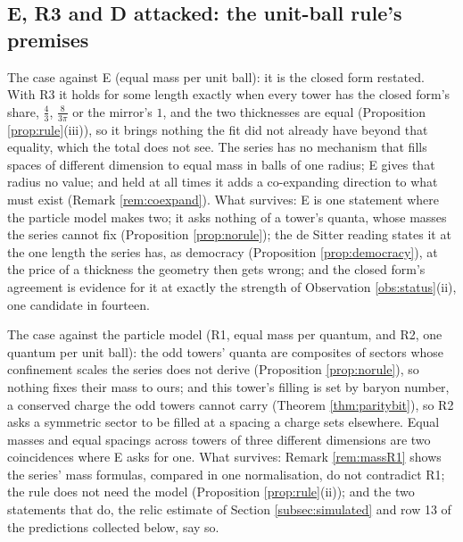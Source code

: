 \documentclass[11pt]{article}
\theoremstyle{definition}
\begin{document}
\subsection*{E, R3 and D attacked: the unit-ball rule's premises}

The case against E (equal mass per unit ball): it is the closed form restated. With R3 it holds for some length exactly when every tower has the closed form's share, $\tfrac{4}{3}$, $\tfrac{8}{3\pi}$ or the mirror's $1$, and the two thicknesses are equal (Proposition \ref{prop:rule}(iii)), so it brings nothing the fit did not already have beyond that equality, which the total does not see. The series has no mechanism that fills spaces of different dimension to equal mass in balls of one radius; E gives that radius no value; and held at all times it adds a co-expanding direction to what must exist (Remark \ref{rem:coexpand}). What survives: E is one statement where the particle model makes two; it asks nothing of a tower's quanta, whose masses the series cannot fix (Proposition \ref{prop:norule}); the de Sitter reading states it at the one length the series has, as democracy (Proposition \ref{prop:democracy}), at the price of a thickness the geometry then gets wrong; and the closed form's agreement is evidence for it at exactly the strength of Observation \ref{obs:status}(ii), one candidate in fourteen.

The case against the particle model (R1, equal mass per quantum, and R2, one quantum per unit ball): the odd towers' quanta are composites of sectors whose confinement scales the series does not derive (Proposition \ref{prop:norule}), so nothing fixes their mass to ours; and this tower's filling is set by baryon number, a conserved charge the odd towers cannot carry (Theorem \ref{thm:paritybit}), so R2 asks a symmetric sector to be filled at a spacing a charge sets elsewhere. Equal masses and equal spacings across towers of three different dimensions are two coincidences where E asks for one. What survives: Remark \ref{rem:massR1} shows the series' mass formulas, compared in one normalisation, do not contradict R1; the rule does not need the model (Proposition \ref{prop:rule}(ii)); and the two statements that do, the relic estimate of Section \ref{subsec:simulated} and row 13 of the predictions collected below, say so.
\end{document}
